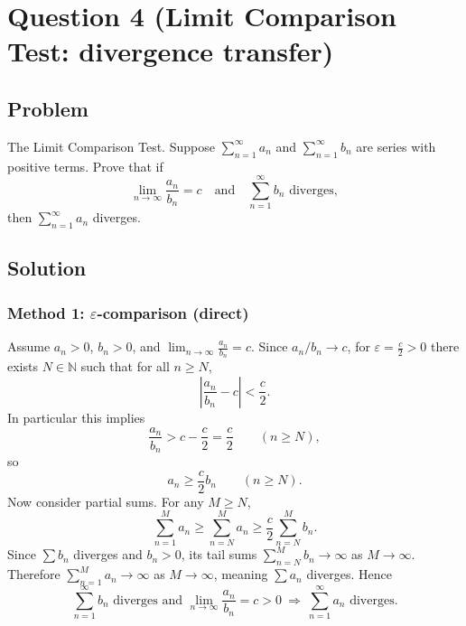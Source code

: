 \documentclass[12pt]{article}
\begin{document}
\newpage
\section*{Question 4 (Limit Comparison Test: divergence transfer)}
\subsection*{Problem}
The Limit Comparison Test. Suppose \(\sum_{n=1}^\infty a_n\) and \(\sum_{n=1}^\infty b_n\) are series with positive terms. Prove that if
\[
\lim_{n\to\infty}\frac{a_n}{b_n}=c
\quad\text{and}\quad
\sum_{n=1}^\infty b_n \text{ diverges},
\]
then \(\sum_{n=1}^\infty a_n\) diverges.

\subsection*{Solution}

\subsubsection*{Method 1: \(\varepsilon\)-comparison (direct)}
Assume \(a_n>0\), \(b_n>0\), and \(\lim_{n\to\infty}\frac{a_n}{b_n}=c\).
Since \(a_n/b_n\to c\), for \(\varepsilon=\frac{c}{2}>0\) there exists \(N\in\mathbb{N}\) such that for all \(n\ge N\),
\[
\left|\frac{a_n}{b_n}-c\right|<\frac{c}{2}.
\]
In particular this implies
\[
\frac{a_n}{b_n}>c-\frac{c}{2}=\frac{c}{2}\qquad(n\ge N),
\]
so
\[
a_n\ge \frac{c}{2} b_n \qquad (n\ge N).
\]
Now consider partial sums. For any \(M\ge N\),
\[
\sum_{n=1}^{M} a_n \ge \sum_{n=N}^{M} a_n \ge \frac{c}{2}\sum_{n=N}^{M} b_n.
\]
Since \(\sum b_n\) diverges and \(b_n>0\), its tail sums \(\sum_{n=N}^{M} b_n\to\infty\) as \(M\to\infty\).
Therefore \(\sum_{n=1}^{M} a_n\to\infty\) as \(M\to\infty\), meaning \(\sum a_n\) diverges. Hence
\[
\boxed{\sum_{n=1}^\infty b_n \text{ diverges and } \lim_{n\to\infty}\frac{a_n}{b_n}=c>0
\ \Longrightarrow\ 
\sum_{n=1}^\infty a_n \text{ diverges}.}
\]

\newpage
\end{document}
